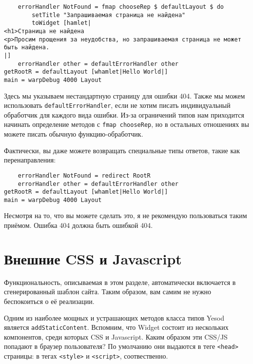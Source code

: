 \begin{lstlisting}
    errorHandler NotFound = fmap chooseRep $ defaultLayout $ do
        setTitle "Запрашиваемая страница не найдена"
        toWidget [hamlet|
<h1>Страница не найдена
<p>Просим прощения за неудобства, но запрашиваемая страница не может быть найдена.
|]
    errorHandler other = defaultErrorHandler other
getRootR = defaultLayout [whamlet|Hello World|]
main = warpDebug 4000 Layout
\end{lstlisting}

Здесь мы указываем нестандартную страницу для ошибки 404. Также мы можем использовать \lstinline!defaultErrorHandler!, если не хотим писать индивидуальный обработчик для каждого вида ошибки. Из-за ограничений типов нам приходится начинать определение методов с \lstinline!fmap chooseRep!, но в остальных отношениях вы можете писать обычную функцию-обработчик.

Фактически, вы даже можете возвращать специальные типы ответов, такие как перенаправления:

\begin{lstlisting}
    errorHandler NotFound = redirect RootR
    errorHandler other = defaultErrorHandler other
getRootR = defaultLayout [whamlet|Hello World|]
main = warpDebug 4000 Layout
\end{lstlisting}

\begin{remark}
Несмотря на то, что вы можете сделать это, я не рекомендую пользоваться таким приёмом. Ошибка 404 должна быть ошибкой 404.
\end{remark}

\section {Внешние CSS и Javascript}

\begin{remark}
Функциональность, описываемая в этом разделе, автоматически включается в сгенерированный шаблон сайта. Таким образом, вам самим не нужно беспокоиться о её реализации.
\end{remark}

Одним из наиболее мощных и устрашающих методов класса типов Yesod является \lstinline!addStaticContent!. Вспомним, что Widget состоит из нескольких компонентов, среди которых CSS и Javascript. Каким образом эти CSS/JS попадают в браузер пользователя? По умолчанию они выдаются в теге \lstinline!<head>! страницы: в тегах \lstinline!<style>! и \lstinline!<script>!, соотвественно.

